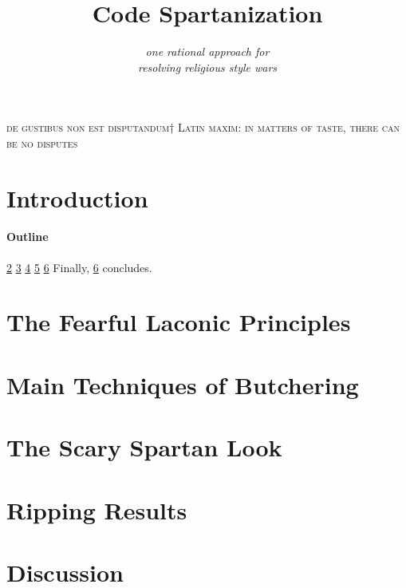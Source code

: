 \documentclass[preprint,10pt,nonatbib]{sigplanconf}
\title{Code Spartanization}
\subtitle{\scriptsize \emph{one rational approach for\\ resolving religious style wars}}
\begin{document}
\textsc{de gustibus non est disputandum†{%
    Latin maxim: in matters of taste, there can be no disputes
}}
{\let\newpage\relax\maketitle}

\begin{abstract}
  
\end{abstract}

\section{Introduction}


\paragraph{Outline}
\cref{section:principia}
\cref{section:techniques}
\cref{section:look}
\cref{section:initial}
\cref{section:zz}
Finally, \cref{section:zz} concludes.

\section{The Fearful Laconic Principles}
\label{section:principia}


\section{Main Techniques of Butchering}
\label{section:techniques}


\section{The Scary Spartan Look}
\label{section:look}


\section{Ripping Results}
\label{section:initial}


\section{Discussion}
\label{section:zz}

\balance
\small

\end{document}
